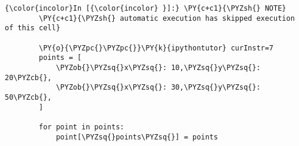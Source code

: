     \begin{Verbatim}[commandchars=\\\{\}]
{\color{incolor}In [{\color{incolor} }]:} \PY{c+c1}{\PYZsh{} NOTE}
        \PY{c+c1}{\PYZsh{} automatic execution has skipped execution of this cell}
        
        \PY{o}{\PYZpc{}\PYZpc{}}\PY{k}{ipythontutor} curInstr=7
        points = [
            \PYZob{}\PYZsq{}x\PYZsq{}: 10,\PYZsq{}y\PYZsq{}: 20\PYZcb{},
            \PYZob{}\PYZsq{}x\PYZsq{}: 30,\PYZsq{}y\PYZsq{}: 50\PYZcb{},
        ]
        
        for point in points:
            point[\PYZsq{}points\PYZsq{}] = points
\end{Verbatim}



    
    
    
